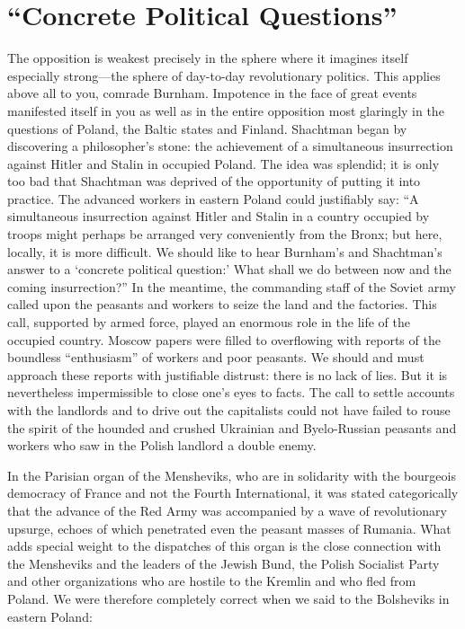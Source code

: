 \section*{“Concrete Political Questions”}

The opposition is weakest precisely in the sphere where it imagines itself especially strong---the sphere of day-to-day revolutionary politics. This applies above all to you, comrade Burnham. Impotence in the face of great events manifested itself in you as well as in the entire opposition most glaringly in the questions of Poland, the Baltic states and Finland. Shachtman began by discovering a philosopher’s stone: the achievement of a simultaneous insurrection against Hitler and Stalin in occupied Poland. The idea was splendid; it is only too bad that Shachtman was deprived of the opportunity of putting it into practice. The advanced workers in eastern Poland could justifiably say: ``A simultaneous insurrection against Hitler and Stalin in a country occupied by troops might perhaps be arranged very conveniently from the Bronx; but here, locally, it is more difficult. We should like to hear Burnham’s and Shachtman’s answer to a ‘concrete political question:’ What shall we do between now and the coming insurrection?” In the meantime, the commanding staff of the Soviet army called upon the peasants and workers to seize the land and the factories. This call, supported by armed force, played an enormous role in the life of the occupied country. Moscow papers were filled to overflowing with reports of the boundless “enthusiasm” of workers and poor peasants. We should and must approach these reports with justifiable distrust: there is no lack of lies. But it is nevertheless impermissible to close one’s eyes to facts. The call to settle accounts with the landlords and to drive out the capitalists could not have failed to rouse the spirit of the hounded and crushed Ukrainian and Byelo-Russian peasants and workers who saw in the Polish landlord a double enemy.

In the Parisian organ of the Mensheviks, who are in solidarity with the bourgeois democracy of France and not the Fourth International, it was stated categorically that the advance of the Red Army was accompanied by a wave of revolutionary upsurge, echoes of which penetrated even the peasant masses of Rumania. What adds special weight to the dispatches of this organ is the close connection with the Mensheviks and the leaders of the Jewish Bund, the Polish Socialist Party and other organizations who are hostile to the Kremlin and who fled from Poland. We were therefore completely correct when we said to the Bolsheviks in eastern Poland:

